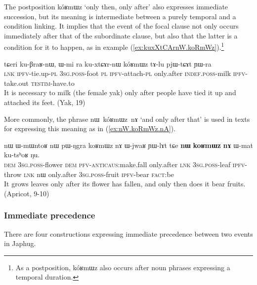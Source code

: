 \documentclass[oldfontcommands,oneside,a4paper,11pt]{article}
\newcommand{\ipa}[1]{{\phon \mbox{#1}}} %
\newcommand{\refb}[1]{(\ref{#1})}
\begin{document}
The postposition \ipa{kóʁmɯz} `only then, only after' also expresses immediate succession, but its meaning is intermediate between a purely temporal and a condition linking. It implies that the event of the focal clause not only occurs immediately after that of the subordinate clause, but also that the latter is a condition for it to happen, as  in example \refb{ex:kuxXtCArnW.koRmWz}.\footnote{As a postposition, \ipa{kóʁmɯz} also occurs after noun phrases expressing a temporal duration.}


\begin{exe}
\ex \label{ex:kuxXtCArnW.koRmWz}
\gll
\ipa{tɕeri}  	\ipa{ku-βraʁ-nɯ,}  	\ipa{ɯ-mi}  	\ipa{ra}  	\ipa{ku-xtɕɤr-nɯ}  	\ipa{kóʁmɯz}  	\ipa{tɤ-lu}  	\ipa{pjɯ-tɕɤt}  	\ipa{ɲɯ-ra}  \\
\textsc{lnk} \textsc{ipfv}-tie.up-\textsc{pl} \textsc{3sg.poss}-foot \textsc{pl} \textsc{ipfv}-attach-\textsc{pl} only.after \textsc{indef.poss}-milk \textsc{ipfv}-take.out  \textsc{testim}-have.to \\
\glt It is necessary to milk (the female yak) only after people have tied it up and attached its feet. (Yak, 19)
\end{exe}

More commonly, the phrase \ipa{nɯ kóʁmɯz nɤ} `and only after that' is used in texts for expressing this meaning as in \refb{ex:nW.koRmWz.nA}.
\begin{exe}
\ex \label{ex:nW.koRmWz.nA}
\gll
\ipa{nɯ}  	\ipa{ɯ-mɯntoʁ}  	\ipa{nɯ}  	\ipa{pɯ-ŋgra}  	\ipa{koʁmɯz}  	\ipa{nɤ}  	\ipa{ɯ-jwaʁ}  	\ipa{ɲɯ-lɤt}  	\ipa{tɕe}  	\ipa{\textbf{nɯ}}  	\ipa{\textbf{koʁmɯz}}  	\ipa{\textbf{nɤ}}  	\ipa{ɯ-mat}  	\ipa{ku-tsʰoʁ}  	\ipa{ŋu.}  	\\
\textsc{dem} \textsc{3sg.poss}-flower \textsc{dem} \textsc{pfv}-\textsc{anticaus}:make.fall only.after \textsc{lnk} \textsc{3sg.poss}-leaf \textsc{ipfv}-throw \textsc{lnk}  	\ipa{nɯ} only.after \textsc{3sg.poss}-fruit \textsc{ipfv}-bear \textsc{fact}:be \\
\glt It grows leaves only after its flower has fallen, and only then does it bear fruits. (Apricot, 9-10)
\end{exe}


\subsubsection{Immediate precedence}
There are four constructions expressing immediate precedence between two events in Japhug. 
\end{document}

